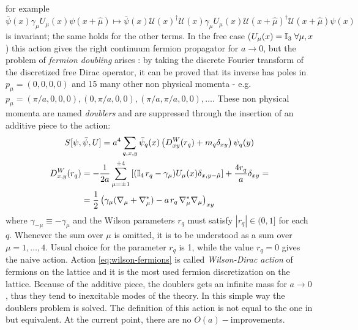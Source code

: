 \documentclass[english, LaM, oneside, noexaminfo]{sapthesis}
\begin{document}
for example $\bar \psi (x) \gamma_\mu U_\mu (x) \psi (x + \hat \mu) \mapsto \bar\psi (x) \mathcal{U}(x)^\dagger \mathcal{U} (x) \gamma_\mu U_\mu (x) \mathcal{U} (x+\hat\mu)^\dagger \mathcal{U}(x+\hat\mu) \psi (x)$ is invariant;
the same holds for the other terms.
\newline
In the free case ($U_\mu (x) = \mathbb{I}_3 \hspace*{1mm} \forall \mu ,x$) this action gives the right continuum fermion propagator for $a\rightarrow 0$, but the problem of \textit{fermion doubling} arises \cite{montvay-munster}:
by taking the discrete Fourier transform of the discretized free Dirac operator, it can be proved that its inverse has poles in $p_\mu = (0,0,0,0)$ and 15 many other non physical momenta - e.g. $p_\mu = (\pi/a,0,0,0), (0,\pi/a,0,0), (\pi/a,\pi/a,0,0),\dots$.
These non physical momenta are named \textit{doublers} and are suppressed through the insertion of an additive piece to the action:
\begin{equation}\label{eq:wilson-fermions}
    \begin{gathered}
        S[\psi,\bar \psi, U] = a^4\sum_{q,x,y} \bar \psi_q (x) \left( D^W_{xy}(r_q) + m_q \delta_{xy}  \right) \psi_q (y) \\
        \begin{aligned}
            D_{x,y}^W (r_q)
            & = -\frac{1}{2a}\sum_{\mu = \pm 1}^{\pm 4} \left[ (\mathbb{I}_4 \hspace*{0.5mm} r_q - \gamma_\mu)U_\mu (x) \delta_{x,y-\hat \mu} \right] + \frac{4r_q}{a}\delta_{xy} = \\
            & = \frac{1}{2}\left(\gamma_\mu(\nabla_\mu +\nabla_\mu^*) - a\hspace*{0.5mm}r_q\hspace*{0.5mm}\nabla_\mu^*\nabla_\mu\right)_{xy}
        \end{aligned}
    \end{gathered}
\end{equation}
where $\gamma_{-\mu} \equiv -\gamma_\mu$ and the Wilson parameters $r_q$ must satisfy $|r_q|\in(0,1]$ for each $q$.
Whenever the sum over $\mu$ is omitted, it is to be understood as a sum over $\mu = 1, \dots, 4$.
Usual choice for the parameter $r_q$ is 1, while the value $r_q = 0$ gives the naive action.
Action \ref{eq:wilson-fermions} is called \textit{Wilson-Dirac action} of fermions on the lattice and it is the most used fermion discretization on the lattice.
Because of the additive piece, the doublers gets an infinite mass for $a \rightarrow 0$, thus they tend to inexcitable modes of the theory.
In this simple way the doublers problem is solved.
The definition of this action is not equal to the one in \cite{montvay-munster}\cite{gattringer-lang} but equivalent.
At the current point, there are no $O(a)-$improvements.
\end{document}
